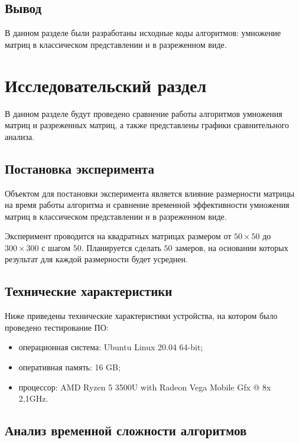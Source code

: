 \section{Вывод}

В данном разделе были разработаны исходные коды алгоритмов: умножение матриц в классическом представлении и в разреженном виде.


\chapter{Исследовательский раздел}

В данном разделе будут проведено сравнение работы алгоритмов умножения матриц и разреженных матриц, а также представлены графики сравнительного анализа.

\section{Постановка эксперимента}

Объектом для постановки эксперимента является влияние размерности матрицы на время работы алгоритма и сравнение временной эффективности умножения матриц в классическом представлении и в разреженном виде.

Эксперимент проводится на квадратных матрицах размером от $50\times50$ до $300\times300$ с шагом $50$. Планируется сделать $50$ замеров, на основании которых результат для каждой размерности будет усреднен.

\section{Технические характеристики}

Ниже приведены технические характеристики устройства, на котором было проведено тестирование ПО:

\begin{itemize}[$\bullet$]
	\item операционная система: Ubuntu Linux 20.04 64-bit;
	\item оперативная память: 16 GB;
	\item процессор: AMD Ryzen 5 3500U with Radeon Vega Mobile Gfx @ 8x 2,1GHz.
\end{itemize}

\section{Анализ временной сложности алгоритмов}

